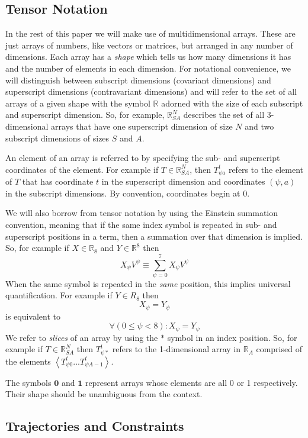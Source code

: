 \documentclass{article}
\begin{document}
\subsection{Tensor Notation}

In the rest of this paper we will make use of multidimensional arrays. These are just arrays of numbers, like vectors or matrices, but arranged in any number of dimensions. Each array has a \textit{shape} which tells us how many dimensions it has and the number of elements in each dimension. For notational convenience, we will distinguish between subscript dimensions (covariant dimensions) and superscript dimensions (contravariant dimensions) and will refer to the set of all arrays of a given shape with the symbol $\mathbb{R}$ adorned with the size of each subscript and superscript dimension.  So, for example, $\mathbb{R}^N_{SA}$ describes the set of all 3-dimensional arrays that have one superscript dimension of size $N$ and two subscript dimensions of sizes $S$ and $A$.

An element of an array is referred to by specifying the sub- and superscript coordinates of the element. For example if $T \in \mathbb{R}^N_{SA}$, then $T^t_{\psi a}$ refers to the element of $T$ that has coordinate $t$ in the superscript dimension and coordinates $(\psi,a)$ in the subscript dimensions. By convention, coordinates begin at 0.

We will also borrow from tensor notation by using the Einstein summation convention, meaning that if the same index symbol is repeated in sub- and superscript positions in a term, then a summation over that dimension is implied. So, for example if $X \in \mathbb{R}_8$ and $Y \in \mathbb{R}^8$ then
\[
X_\psi V^\psi \equiv \sum_{\psi=0}^7 X_\psi  V^\psi
\]
When the same symbol is repeated in the \textit{same} position, this implies universal quantification. For example if $Y\in R_8$ then
\[
X_\psi = Y_\psi 
\]
is equivalent to
\[
\forall (0 \le \psi < 8) : X_\psi = Y_\psi 
\]
We refer to \textit{slices} of an array by using the $*$ symbol in an index position. So, for example if $T \in \mathbb{R}^N_{SA}$ then $T^t_{\psi *}$ refers to the 1-dimensional array in $\mathbb{R}_A$ comprised of the elements $\left<T^t_{\psi 0}...T^t_{\psi A-1}\right>$.

The symbols $\mathbf{0}$ and $\mathbf{1}$ represent arrays whose elements are all 0 or 1 respectively. Their shape should be unambiguous from the context.

\subsection{Trajectories and Constraints}
\end{document}
